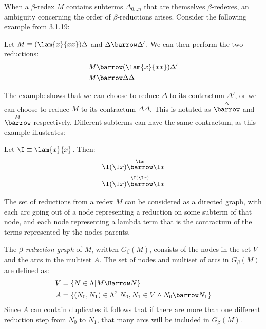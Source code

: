 When a $\beta$-redex $M$ contains subterms $\Delta_{0\hdots n}$ that are themselves 
$\beta$-redexes, an ambiguity concerning the order of $\beta$-reductions arises.
Consider the following example from \cite{Barendregt} 3.1.19:
\begin{example}
	Let $M\equiv(\lam{x}{xx})\Delta$ and $\Delta\barrow\Delta'$. We can then perform the two reductions:
\begin{align*}
	M&\barrow(\lam{x}{xx})\Delta' \\
	M&\barrow\Delta\Delta
\end{align*}
\end{example}
The example shows that we can choose to reduce $\Delta$ to its contractum $\Delta'$, or
we can choose to reduce $M$ to its contractum $\Delta\Delta$. This is notated as 
$\overset{\Delta}\barrow$ and $\overset{M}\barrow$ respectively. Different
subterms can have the same contractum, as this example illustrates:
\begin{example}
	Let $\I\equiv\lam{x}{x}$. Then:
\begin{align*}
	\I(\I x)&\overset{\I x}\barrow\I x \\
	\I(\I x)&\overset{\I(\I x)}\barrow\I x
\end{align*}
\end{example}
The set of reductions from a redex $M$ can
be considered as a directed graph, with each arc going out of a node representing
a reduction on some subterm of that node, and each node representing a lambda term that
is the contractum of the terms represented by the nodes parents.
\begin{definition}
	The \emph{$\beta$ reduction graph} of $M$, written $G_\beta(M)$, consists
	of the nodes in the set $V$ and the arcs in the multiset $A$. The set
	of nodes and multiset of arcs in $G_\beta(M)$ are defined as:
	\begin{align*}
		V&=\{N\in\Lambda|M\Barrow N\} \\
		A&=\{(N_0, N_1)\in\Lambda^2|N_0,N_1\in V\wedge N_0\barrow N_1\}
	\end{align*}
	Since $A$ can contain duplicates it follows that if there are more than one
	different reduction step from $N_0$ to $N_1$, that many arcs will be included 
	in $G_\beta(M)$.
\end{definition}
